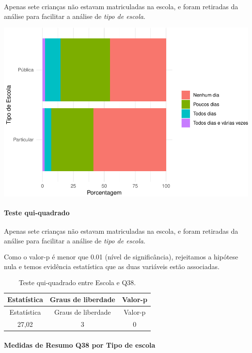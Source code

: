 \documentclass[]{article}
\let\oldparagraph\paragraph
\renewcommand{\paragraph}[1]{\oldparagraph{#1}\mbox{}}
\begin{document}
Apenas sete crianças não estavam matriculadas na escola, e foram retiradas da análise para facilitar a análise de \emph{tipo de escola}.

\begin{center}\includegraphics[width=0.75\linewidth]{relatorio_covid19_files/figure-latex/unnamed-chunk-1470-1} \end{center}

\hypertarget{teste-qui-quadrado-126}{%
\paragraph{Teste qui-quadrado}\label{teste-qui-quadrado-126}}

Apenas sete crianças não estavam matriculadas na escola, e foram retiradas da análise para facilitar a análise de \emph{tipo de escola}.

Como o valor-p é menor que 0.01 (nível de significância), rejeitamos a hipótese nula e temos evidência estatística que as duas variáveis estão associadas.

\begin{longtable}[]{@{}ccc@{}}
\caption{\label{tab:unnamed-chunk-1472}Teste qui-quadrado entre Escola e Q38.}\tabularnewline
\toprule
Estatística & Graus de liberdade & Valor-p\tabularnewline
\midrule
\endfirsthead
\toprule
Estatística & Graus de liberdade & Valor-p\tabularnewline
\midrule
\endhead
27,02 & 3 & 0\tabularnewline
\bottomrule
\end{longtable}

\cleardoublepage

\hypertarget{medidas-de-resumo-q38-por-tipo-de-escola}{%
\paragraph{Medidas de Resumo Q38 por Tipo de escola}\label{medidas-de-resumo-q38-por-tipo-de-escola}}
\end{document}
